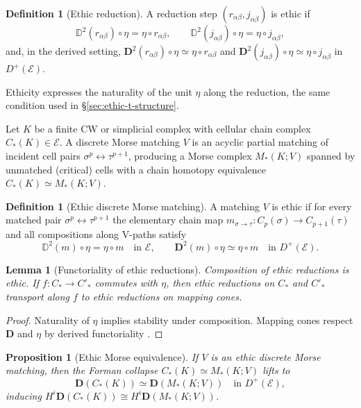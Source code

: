 \documentclass[12pt]{article}
\newcommand{\E}{\mathcal{E}}
\newcommand{\DD}{\mathbb{D}}
\theoremstyle{plain}
\newtheorem{lemma}[theorem]{Lemma}
\newtheorem{proposition}[theorem]{Proposition}
\theoremstyle{definition}
\newtheorem{definition}[theorem]{Definition}
\theoremstyle{remark}
\numberwithin{equation}{section}
\begin{document}
\begin{definition}[Ethic reduction]
A reduction step \((r_{\alpha\beta},j_{\alpha\beta})\) is ethic if
\[
\DD^2(r_{\alpha\beta})\circ \eta = \eta\circ r_{\alpha\beta},
\qquad
\DD^2(j_{\alpha\beta})\circ \eta = \eta\circ j_{\alpha\beta},
\]
and, in the derived setting,
\(\mathbf D^{2}(r_{\alpha\beta})\circ \eta\simeq \eta\circ r_{\alpha\beta}\) and \(\mathbf D^{2}(j_{\alpha\beta})\circ \eta\simeq \eta\circ j_{\alpha\beta}\)
in \(D^{+}(\E)\).
\end{definition}

Ethicity expresses the naturality of the unit \(\eta\) along the reduction, the same condition used in \S\ref{sec:ethic-t-structure}.

Let \(K\) be a finite CW or simplicial complex with cellular chain complex \(C_\ast(K)\in \E\). A discrete Morse matching \(V\) \cite{Forman1998} is an acyclic partial matching of incident cell pairs \(\sigma^p\leftrightarrow \tau^{p+1}\), producing a Morse complex \(M_\ast(K;V)\) spanned by unmatched (critical) cells with a chain homotopy equivalence \(C_\ast(K)\simeq M_\ast(K;V)\).

\begin{definition}[Ethic discrete Morse matching]
A matching \(V\) is ethic if for every matched pair \(\sigma^p\leftrightarrow \tau^{p+1}\) the elementary chain map \(m_{\sigma\to\tau}:C_p(\sigma)\to C_{p+1}(\tau)\) and all compositions along V-paths satisfy
\[
\DD^{2}(m)\circ \eta=\eta\circ m\quad\text{in }\E,
\qquad
\mathbf D^{2}(m)\circ \eta\simeq \eta\circ m\quad\text{in }D^{+}(\E).
\]
\end{definition}

\begin{lemma}[Functoriality of ethic reductions]
Composition of ethic reductions is ethic. If \(f:C_\ast\to C'_\ast\) commutes with \(\eta\), then ethic reductions on \(C_\ast\) and \(C'_\ast\) transport along \(f\) to ethic reductions on mapping cones.
\end{lemma}

\begin{proof}
Naturality of \(\eta\) implies stability under composition. Mapping cones respect \(\mathbf D\) and \(\eta\) by derived functoriality \cite{GelfandManin2003}.
\end{proof}

\begin{proposition}[Ethic Morse equivalence]
If \(V\) is an ethic discrete Morse matching, then the Forman collapse \(C_\ast(K)\simeq M_\ast(K;V)\) lifts to
\[
\mathbf D(C_\ast(K)) \simeq \mathbf D(M_\ast(K;V))\quad\text{in }D^{+}(\E),
\]
inducing \(H^i\mathbf D(C_\ast(K))\cong H^i\mathbf D(M_\ast(K;V))\).
\end{proposition}
\end{document}
